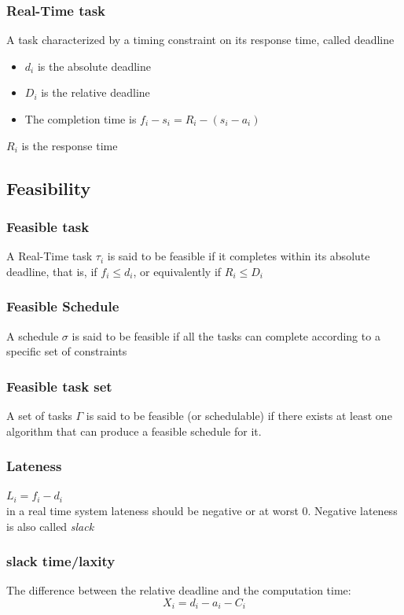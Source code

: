 \documentclass{book}
\begin{document}
\subsubsection{Real-Time task}
A task characterized by a timing constraint on its response time, called deadline
\begin{itemize}
    \item $d_i$ is the absolute deadline
    \item $D_i$ is the relative deadline
    \item The completion time is $f_i-s_i=R_i-(s_i-a_i)$
\end{itemize}
$R_i$ is the response time

\subsection{Feasibility}
\subsubsection{Feasible task}
 A Real-Time task $\tau_i$ is said to be feasible if it completes within its absolute deadline, that is, if $f_i \leq d_i$, or equivalently if $R_i \leq D_i$\\
\subsubsection{Feasible Schedule}
A schedule $\sigma$ is said to be feasible if all the tasks can complete according to a specific set of constraints
\subsubsection{Feasible task set}
A set of tasks $\Gamma$ is said to be feasible (or schedulable) if there exists at least one algorithm that can produce a feasible schedule for it.

\subsubsection{Lateness}
$L_i=f_i-d_i$\\
in a real time system lateness should be negative or at worst 0. Negative lateness is also called \emph{slack}

\subsubsection{slack time/laxity}
The difference between the relative deadline and the computation time:
\[ X_i= d_i-a_i-C_i\]
\end{document}
